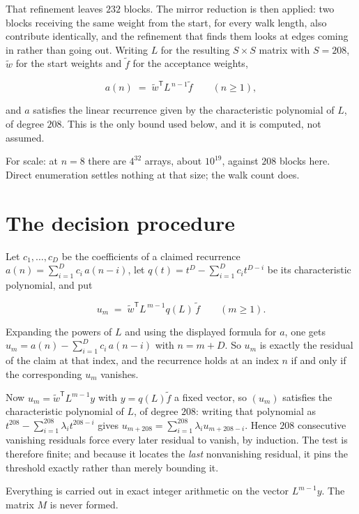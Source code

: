 \documentclass[11pt]{article}
\theoremstyle{definition}
\begin{document}
That refinement leaves $232$ blocks. The mirror reduction is then applied: two blocks receiving the same weight from the start, for every walk length, also contribute identically, and the refinement that finds them looks at edges coming in rather than going out. Writing $L$ for the resulting $S \times S$ matrix with $S = 208$, $\tilde w$ for the start weights and $\tilde f$ for the acceptance weights,

\[a(n) \;=\; \tilde w^{\mathsf T} L^{\,n-1} \tilde f \qquad (n \ge 1),\]

and $a$ satisfies the linear recurrence given by the characteristic polynomial of $L$, of degree $208$. This is the only bound used below, and it is computed, not assumed.

For scale: at $n = 8$ there are $4^{32}$ arrays, about $10^{19}$, against $208$ blocks here. Direct enumeration settles nothing at that size; the walk count does.

\section{The decision procedure}

Let $c_1,\dots,c_D$ be the coefficients of a claimed recurrence $a(n) = \sum_{i=1}^{D} c_i\,a(n-i)$, let $q(t) = t^{D} - \sum_{i=1}^{D} c_i t^{D-i}$ be its characteristic polynomial, and put

\[u_m \;=\; \tilde w^{\mathsf T} L^{\,m-1} q(L)\,\tilde f \qquad (m \ge 1).\]

Expanding the powers of $L$ and using the displayed formula for $a$, one gets $u_m = a(n) - \sum_{i=1}^{D} c_i\,a(n-i)$ with $n = m + D$. So $u_m$ is exactly the residual of the claim at that index, and the recurrence holds at an index $n$ if and only if the corresponding $u_m$ vanishes.

Now $u_m = \tilde w^{\mathsf T} L^{m-1} y$ with $y = q(L)\tilde f$ a fixed vector, so $(u_m)$ satisfies the characteristic polynomial of $L$, of degree $208$: writing that polynomial as $t^{208} - \sum_{i=1}^{208} \lambda_i t^{208-i}$ gives $u_{m+208} = \sum_{i=1}^{208} \lambda_i u_{m+208-i}$. Hence $208$ consecutive vanishing residuals force every later residual to vanish, by induction. The test is therefore finite; and because it locates the {\itshape last} nonvanishing residual, it pins the threshold exactly rather than merely bounding it.

Everything is carried out in exact integer arithmetic on the vector $L^{m-1}y$. The matrix $M$ is never formed.
\end{document}
